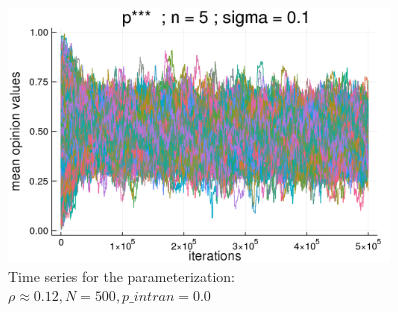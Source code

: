 \documentclass{article}
\begin{document}
    \begin{figure}[H]
      \centering
      \includegraphics[width=0.9\textwidth]{img/compare-ps/Poodlcalculatep***n5-rho01118033988749895-sigma01-00intrans.png}
      \caption{Time series for the parameterization: \(\rho \approx 0.12, N =
        500, p\_intran = 0.0 \)}
      \label{fig:tseries3}
    \end{figure}
\end{document}
